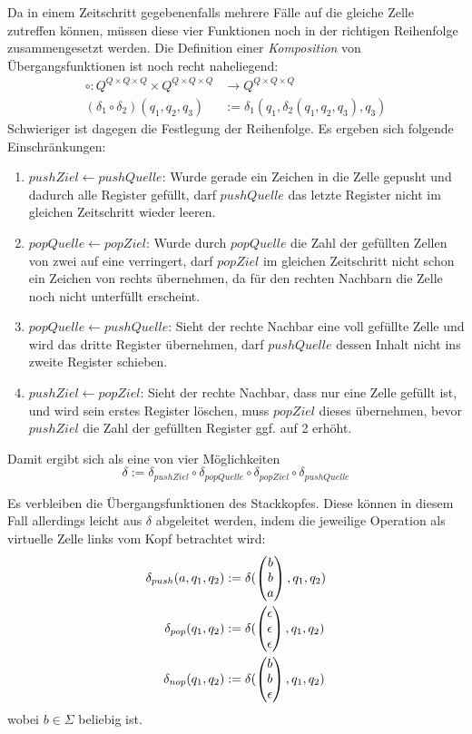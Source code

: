 \documentclass{article}
\begin{document}
Da in einem Zeitschritt gegebenenfalls mehrere Fälle auf die gleiche Zelle zutreffen können, müssen diese vier Funktionen noch in der richtigen Reihenfolge zusammengesetzt werden. Die Definition einer \emph{Komposition} von Übergangsfunktionen ist noch recht naheliegend:
\begin{align*}
    \circ : Q^{Q \times Q \times Q} \times Q^{Q \times Q \times Q} &\rightarrow Q^{Q \times Q \times Q} \\
    (\delta_1 \circ \delta_2)(q_1,q_2,q_3) &:= \delta_1(q_1,\delta_2(q_1,q_2,q_3),q_3)
\end{align*}
Schwieriger ist dagegen die Festlegung der Reihenfolge. Es ergeben sich folgende Einschränkungen:
\begin{enumerate}
    \item $pushZiel \leftarrow pushQuelle$: Wurde gerade ein Zeichen in die Zelle gepusht und dadurch alle Register gefüllt, darf $pushQuelle$ das letzte Register nicht im gleichen Zeitschritt wieder leeren.
    \item $popQuelle \leftarrow popZiel$: Wurde durch $popQuelle$ die Zahl der gefüllten Zellen von zwei auf eine verringert, darf $popZiel$ im gleichen Zeitschritt nicht schon ein Zeichen von rechts übernehmen, da für den rechten Nachbarn die Zelle noch nicht unterfüllt erscheint.
    \item $popQuelle \leftarrow pushQuelle$: Sieht der rechte Nachbar eine voll gefüllte Zelle und wird das dritte Register übernehmen, darf $pushQuelle$ dessen Inhalt nicht ins zweite Register schieben.
    \item $pushZiel \leftarrow popZiel$: Sieht der rechte Nachbar, dass nur eine Zelle gefüllt ist, und wird sein erstes Register löschen, muss $popZiel$ dieses übernehmen, bevor $pushZiel$ die Zahl der gefüllten Register ggf. auf 2 erhöht.
\end{enumerate}

Damit ergibt sich als eine von vier Möglichkeiten
    \[ \delta := \delta_{pushZiel} \circ \delta_{popQuelle} \circ \delta_{popZiel} \circ \delta_{pushQuelle} \]

Es verbleiben die Übergangsfunktionen des Stackkopfes. Diese können in diesem Fall allerdings leicht aus $\delta$ abgeleitet werden, indem die jeweilige Operation als virtuelle Zelle links vom Kopf betrachtet wird:
\begin{align*}
    \delta_{push}(a, q_1, q_2) &:= \delta(\begin{pmatrix}b\\b\\a\end{pmatrix}, q_1, q_2) \\
    \delta_{pop}(q_1, q_2) &:= \delta(\begin{pmatrix}\epsilon\\\epsilon\\\epsilon\end{pmatrix}, q_1, q_2) \\
    \delta_{nop}(q_1, q_2) &:= \delta(\begin{pmatrix}b\\b\\\epsilon\end{pmatrix}, q_1, q_2) \\
\end{align*}
wobei $b \in \Sigma$ beliebig ist.
\end{document}
